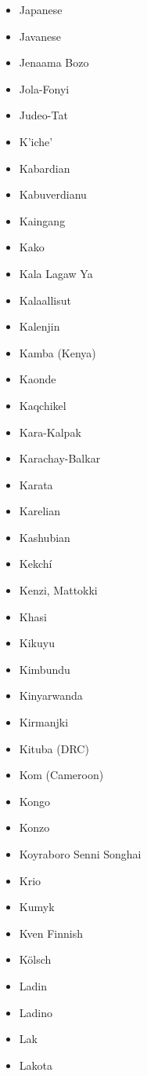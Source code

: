 \documentclass[paper=a4, 12pt]{scrbook}
\begin{document}
\begin{multicols}{3}
\begin{itemize}
        \item Japanese
        \item Javanese
        \item Jenaama Bozo
        \item Jola-Fonyi
        \item Judeo-Tat
        \item K’iche’
        \item Kabardian
        \item Kabuverdianu
        \item Kaingang
        \item Kako
        \item Kala Lagaw Ya
        \item Kalaallisut
        \item Kalenjin
        \item Kamba (Kenya)
        \item Kaonde
        \item Kaqchikel
        \item Kara-Kalpak
        \item Karachay-Balkar
        \item Karata
        \item Karelian
        \item Kashubian
        \item Kekchí
        \item Kenzi, Mattokki
        \item Khasi
        \item Kikuyu
        \item Kimbundu
        \item Kinyarwanda
        \item Kirmanjki
        \item Kituba (DRC)
        \item Kom (Cameroon)
        \item Kongo
        \item Konzo
        \item Koyraboro Senni Songhai
        \item Krio
        \item Kumyk
        \item Kven Finnish
        \item Kölsch
        \item Ladin
        \item Ladino
        \item Lak
        \item Lakota

\end{itemize}
\end{multicols}
\end{document}
